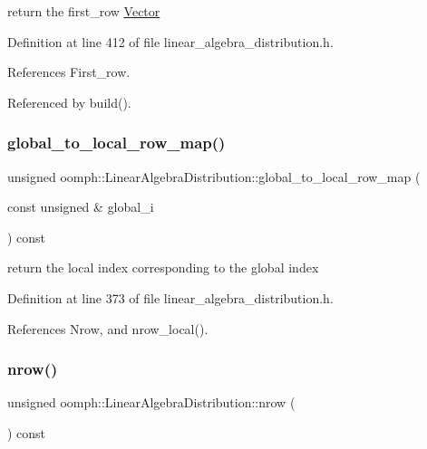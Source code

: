 return the first\+\_\+row \hyperlink{classoomph_1_1Vector}{Vector} 



Definition at line 412 of file linear\+\_\+algebra\+\_\+distribution.\+h.



References First\+\_\+row.



Referenced by build().

\mbox{\label{classoomph_1_1LinearAlgebraDistribution_a899aa7ebf7b1aab1fae2fccfc5b3b43d}} 
\subsubsection{\texorpdfstring{global\+\_\+to\+\_\+local\+\_\+row\+\_\+map()}{global\_to\_local\_row\_map()}}
{\footnotesize\ttfamily unsigned oomph\+::\+Linear\+Algebra\+Distribution\+::global\+\_\+to\+\_\+local\+\_\+row\+\_\+map (\begin{DoxyParamCaption}\item[{const unsigned \&}]{global\+\_\+i }\end{DoxyParamCaption}) const\hspace{0.3cm}{\ttfamily [inline]}}



return the local index corresponding to the global index 



Definition at line 373 of file linear\+\_\+algebra\+\_\+distribution.\+h.



References Nrow, and nrow\+\_\+local().

\mbox{\label{classoomph_1_1LinearAlgebraDistribution_aafad0b69de2284808366b65bd63e493b}} 
\subsubsection{\texorpdfstring{nrow()}{nrow()}}
{\footnotesize\ttfamily unsigned oomph\+::\+Linear\+Algebra\+Distribution\+::nrow (\begin{DoxyParamCaption}{ }\end{DoxyParamCaption}) const\hspace{0.3cm}{\ttfamily [inline]}}



